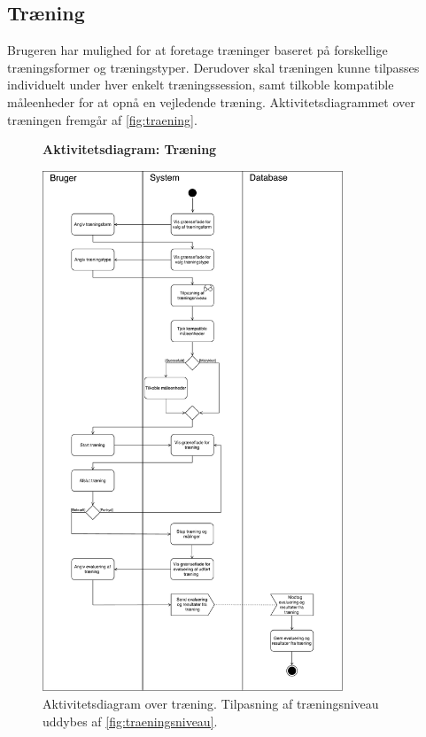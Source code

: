 \subsection*{Træning} \label{sec:traening}
Brugeren har mulighed for at foretage træninger baseret på forskellige træningsformer og træningstyper. Derudover skal træningen kunne tilpasses individuelt under hver enkelt træningssession, samt tilkoble kompatible måleenheder for at opnå en vejledende træning.  
Aktivitetsdiagrammet over træningen fremgår af \autoref{fig:traening}. 

\begin{figure} [H]
\centering
\textbf{Aktivitetsdiagram: Træning}\par\medskip
\includegraphics[width=0.8\textwidth]{figures/aktivitetsdiagram/Traening}
\caption{Aktivitetsdiagram over træning. Tilpasning af træningsniveau uddybes af \autoref{fig:traeningsniveau}.}
\label{fig:traening}
\end{figure}

